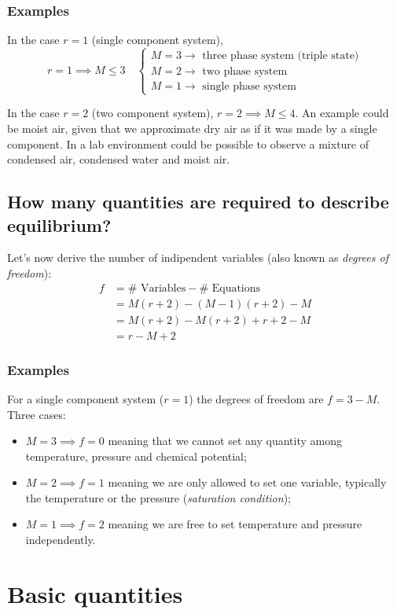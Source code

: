 \subsubsection{Examples}
In the case $r=1$ (single component system),
\begin{equation*}
    r=1 \implies M \le 3 \quad
    \begin{cases}
        M = 3 \to \text{ three phase system (triple state)} \\
        M = 2 \to \text{ two phase system} \\
        M = 1 \to \text{ single phase system}
    \end{cases}
\end{equation*}

In the case $r=2$ (two component system), $r=2 \implies M \le 4$. An example
could be moist air, given that we approximate dry air as if it was made by a
single component. In a lab environment could be possible to observe a mixture of
condensed air, condensed water and moist air.

\subsection{How many quantities are required to describe equilibrium?}
Let’s now derive the number of indipendent variables (also known as
\emph{degrees of freedom}):
\begin{align*}
    f &= \#\text{ Variables} - \#\text{ Equations} \\
    &= M(r+2) - (M-1)(r+2) - M \\
    &= M(r+2) - M(r+2) + r+2 - M \\
    &= r - M + 2
\end{align*}

\subsubsection{Examples}
For a single component system ($r=1$) the degrees of freedom are $f=3-M$. Three
cases:
\begin{itemize}
    \item $M=3 \implies f=0$ meaning that we cannot set any quantity among
    temperature, pressure and chemical potential;
    \item $M=2 \implies f=1$ meaning we are only allowed to set one variable,
    typically the temperature or the pressure (\emph{saturation condition});
    \item $M=1 \implies f=2$ meaning we are free to set temperature and pressure
    independently.
\end{itemize}

\section{Basic quantities}
